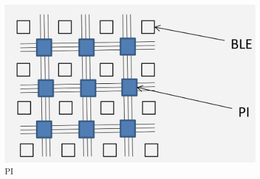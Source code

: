 \documentclass{beamer}
\begin{document}
\begin{frame}
\begin{columns}[c]
\begin{figure}
\includegraphics[width=\linewidth,right]{pi.jpg}
\caption{PI}
\end{figure}

\end{columns}
\end{frame}


\iffalse
\end{document}
